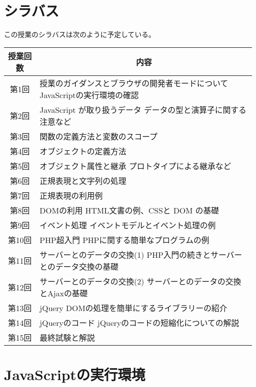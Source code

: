 \section{シラバス}
この授業のシラバスは次のように予定している。
\begin{center}
\begin{tabular}{|c|m{}|}\hline
 授業回数&\multicolumn{1}{c|}{内容}\\\hline
 第1回&授業のガイダンスとブラウザの開発者モードについて \newline
     JavaScriptの実行環境の確認\\\hline
 第2回&JavaScript が取り扱うデータ\newline
     データの型と演算子に関する注意など\\\hline
 第3回& 関数の定義方法と変数のスコープ\\\hline
 第4回& オブジェクトの定義方法\\\hline
 第5回&オブジェクト属性と継承\newline
     プロトタイプによる継承など\\\hline
 第6回&正規表現と文字列の処理  \\\hline
 第7回&正規表現の利用例 \\\hline
 第8回&DOMの利用\newline
     HTML文書の例、CSSと DOM の基礎\\\hline
 第9回&イベント処理 \newline
     イベントモデルとイベント処理の例\\\hline
 第10回&PHP超入門\newline
       PHPに関する簡単なプログラムの例\\\hline
 第11回&サーバーとのデータの交換(1)\newline
     PHP入門の続きとサーバーとのデータ交換の基礎\\\hline
 第12回&サーバーとのデータの交換(2)\newline
     サーバーとのデータの交換とAjaxの基礎\\\hline
 第13回&jQuery \newline
     DOMの処理を簡単にするライブラリーの紹介\\   \hline
 第14回&jQueryのコード\newline
     jQueryのコードの短縮化についての解説 \\\hline
 第15回&最終試験と解説\\ \hline
\end{tabular}
\end{center}
\section{JavaScriptの実行環境}

